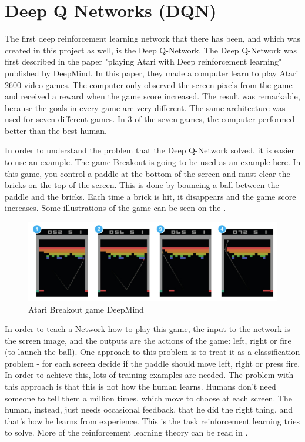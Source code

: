 \section{Deep Q Networks (DQN)}
\label{sec:DQN}
The first deep reinforcement learning network that there has been, and which was created in this project as well, is the Deep Q-Network. The Deep Q-Network was first described in the paper "playing Atari with Deep reinforcement learning" \cite{DBLP:journals/corr/MnihKSGAWR13} published by DeepMind. In this paper, they made a computer learn to play Atari 2600 video games. The computer only observed the screen pixels from the game and received a reward when the game score increased. The result was remarkable, because the goals in every game are very different. The same architecture was used for seven different games. In 3 of the seven games, the computer performed better than the best human.

In order to understand the problem that the Deep Q-Network solved, it is easier to use an example. The game Breakout is going to be used as an example here. In this game, you control a paddle at the bottom of the screen and must clear the bricks on the top of the screen. This is done by bouncing a ball between the paddle and the bricks. Each time a brick is hit, it disappears and the game score increases. Some illustrations of the game can be seen on the .

\begin{figure}[H]
	\centering
	\includegraphics[width=1\textwidth]{Figures/Architecture/DQN/Atari_breakout.png}
	\caption{Atari Breakout game  DeepMind\cite{DBLP:journals/corr/MnihKSGAWR13} }
	\label{fig:Atari_breakout}
\end{figure}

In order to teach a Network how to play this game, the input to the network is the screen image, and the outputs are the actions of the game: left, right or fire (to launch the ball). One approach to this problem is to treat it as a classification problem - for each screen decide if the paddle should move left, right or press fire. In order to achieve this, lots of training examples are needed. The problem with this approach is that this is not how the human learns. Humans don't need someone to tell them a million times, which move to choose at each screen. The human, instead, just needs occasional feedback, that he did the right thing, and that's how he learns from experience. This is the task reinforcement learning tries to solve. More of the reinforcement learning theory can be read in . 

